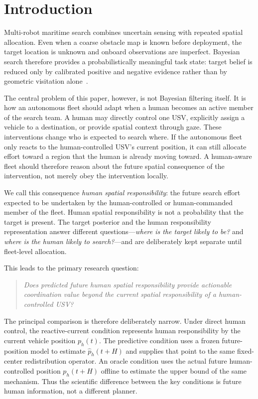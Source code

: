 \documentclass[conference]{IEEEtran}
\begin{document}
\section{Introduction}

Multi-robot maritime search combines uncertain sensing with repeated spatial
allocation. Even when a coarse obstacle map is known before deployment, the
target location is unknown and onboard observations are imperfect. Bayesian
search therefore provides a probabilistically meaningful task state: target
belief is reduced only by calibrated positive and negative evidence rather
than by geometric visitation alone~\cite{b1,b7,b8}.

The central problem of this paper, however, is not Bayesian filtering itself.
It is how an autonomous fleet should adapt when a human becomes an active
member of the search team. A human may directly control one USV, explicitly
assign a vehicle to a destination, or provide spatial context through gaze.
These interventions change who is expected to search where. If the autonomous
fleet only reacts to the human-controlled USV's current position, it can still
allocate effort toward a region that the human is already moving toward. A
human-aware fleet should therefore reason about the future spatial consequence
of the intervention, not merely obey the intervention locally.

We call this consequence \emph{human spatial responsibility}: the future
search effort expected to be undertaken by the human-controlled or
human-commanded member of the fleet. Human spatial responsibility is not a
probability that the target is present. The target posterior and the human
responsibility representation answer different questions---\emph{where is the
target likely to be?} and \emph{where is the human likely to search?}---and
are deliberately kept separate until fleet-level allocation.

This leads to the primary research question:

\begin{quote}
\emph{Does predicted future human spatial responsibility provide actionable
coordination value beyond the current spatial responsibility of a
human-controlled USV?}
\end{quote}

The principal comparison is therefore deliberately narrow. Under direct human
control, the reactive-current condition represents human responsibility by the
current vehicle position $p_h(t)$. The predictive condition uses a frozen
future-position model to estimate $\hat p_h(t+H)$ and supplies that point to the
same fixed-center redistribution operator. An oracle condition uses the actual
future human-controlled position $p_h(t+H)$ offline to estimate the upper bound
of the same mechanism. Thus the scientific difference between the key
conditions is future human information, not a different planner.
\end{document}
